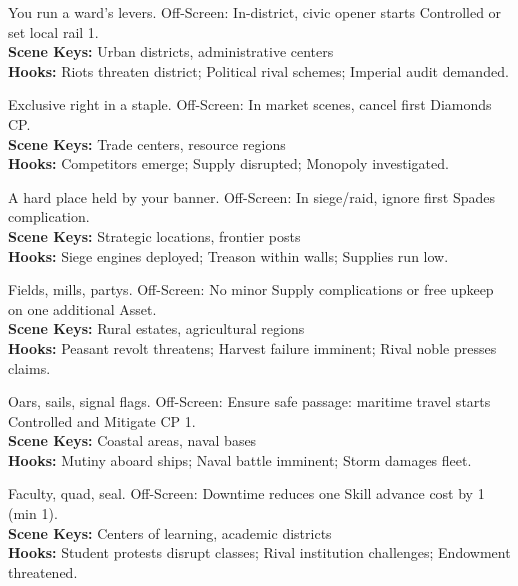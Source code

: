 \documentclass[12pt]{article}
\begin{document}
\begin{description}[leftmargin=*]
  \item[\textbf{City District License}] You run a ward's levers. Off-Screen: In-district, civic opener starts Controlled or set local rail 1. \\
  \textbf{Scene Keys:} Urban districts, administrative centers \\
  \textbf{Hooks:} Riots threaten district; Political rival schemes; Imperial audit demanded.

  \item[\textbf{Regional Monopoly}] Exclusive right in a staple. Off-Screen: In market scenes, cancel first Diamonds CP. \\
  \textbf{Scene Keys:} Trade centers, resource regions \\
  \textbf{Hooks:} Competitors emerge; Supply disrupted; Monopoly investigated.

  \item[\textbf{Fortress/Stronghold}] A hard place held by your banner. Off-Screen: In siege/raid, ignore first Spades complication. \\
  \textbf{Scene Keys:} Strategic locations, frontier posts \\
  \textbf{Hooks:} Siege engines deployed; Treason within walls; Supplies run low.

  \item[\textbf{Large Estate/Demesne}] Fields, mills, partys. Off-Screen: No minor Supply complications or free upkeep on one additional Asset. \\
  \textbf{Scene Keys:} Rural estates, agricultural regions \\
  \textbf{Hooks:} Peasant revolt threatens; Harvest failure imminent; Rival noble presses claims.

  \item[\textbf{Naval Fleet Share}] Oars, sails, signal flags. Off-Screen: Ensure safe passage: maritime travel starts Controlled and Mitigate CP 1. \\
  \textbf{Scene Keys:} Coastal areas, naval bases \\
  \textbf{Hooks:} Mutiny aboard ships; Naval battle imminent; Storm damages fleet.

  \item[\textbf{University College}] Faculty, quad, seal. Off-Screen: Downtime reduces one Skill advance cost by 1 (min 1). \\
  \textbf{Scene Keys:} Centers of learning, academic districts \\
  \textbf{Hooks:} Student protests disrupt classes; Rival institution challenges; Endowment threatened.


\end{description}
\end{document}
